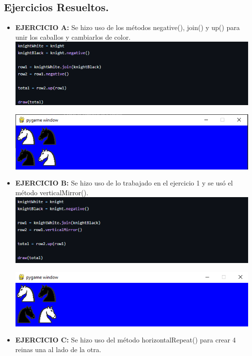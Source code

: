 \documentclass{article}
\begin{document}
\subsection*{Ejercicios Resueltos.}

\begin{itemize}
\item \textbf{EJERCICIO A:} Se hizo uso de los métodos negative(), join() y up() para unir los caballos y cambiarlos de color.\\



\includegraphics[width=\textwidth]{img/9.png}


\includegraphics[width=\textwidth]{img/10.png}
\item \textbf{EJERCICIO B:} Se hizo uso de lo trabajado en el ejercicio 1 y se usó el método verticalMirror().\\



\includegraphics[width=\textwidth]{img/11.png}


\includegraphics[width=\textwidth]{img/12.png}
\item \textbf{EJERCICIO C:} Se hizo uso del método horizontalRepeat() para crear 4 reinas una al lado de la otra. \\




\end{itemize}
\end{document}
